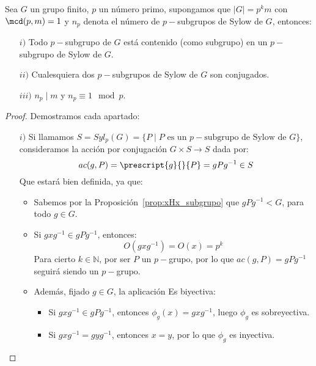 \begin{teo}
    Sea $G$ un grupo finito, $p$ un número primo, supongamos que $|G| = p^k m$ con $\mcd(p,m) = 1$ y $n_p$ denota el número de $p-$subgrupos de Sylow de $G$, entonces:
    \begin{enumerate}
        \item[$i)$] Todo $p-$subgrupo de $G$ está contenido (como subgrupo) en un $p-$subgrupo de Sylow de $G$.
        \item[$ii)$] Cualesquiera dos $p-$subgrupos de Sylow de $G$ son conjugados.
        \item[$iii)$] $n_p \mid m$ y $n_p \equiv 1 \mod p$. 
    \end{enumerate}
    \begin{proof} 
        Demostramos cada apartado:
        \begin{enumerate}
            \item[$i)$] Si llamamos $S = Syl_p(G) = \{P \mid P \text{\ es un $p-$subgrupo\ de Sylow de\ } G\}$, consideramos la acción por conjugación $G\times S\to S$ dada por:
                \begin{equation*}
                    ac(g, P) = \prescript{g}{}{P} = gPg^{-1} \in S
                \end{equation*}
                Que estará bien definida, ya que:
                \begin{itemize}
                    \item Sabemos por la Proposición~\ref{prop:xHx_subgrupo} que $gPg^{-1}<G$, para todo $g\in G$.
                    \item Si $gxg^{-1}\in gPg^{-1}$, entonces:
                        \begin{equation*}
                            O(gxg^{-1}) = O(x) = p^k
                        \end{equation*}
                        Para cierto $k\in \mathbb{N}$, por ser $P$ un $p-$grupo, por lo que $ac(g,P) = gPg^{-1}$ seguirá siendo un $p-$grupo.
                    \item Además, fijado $g\in G$, la aplicación 
                        Es biyectiva:
                        \begin{itemize}
                            \item Si $gxg^{-1}\in gPg^{-1}$, entonces $\phi_g(x) = gxg^{-1}$, luego $\phi_g$ es sobreyectiva.
                            \item Si $gxg^{-1} = gyg^{-1}$, entonces $x = y$, por lo que $\phi_g$ es inyectiva.

\end{itemize}
\end{itemize}
\end{enumerate}
\end{proof}
\end{teo}
